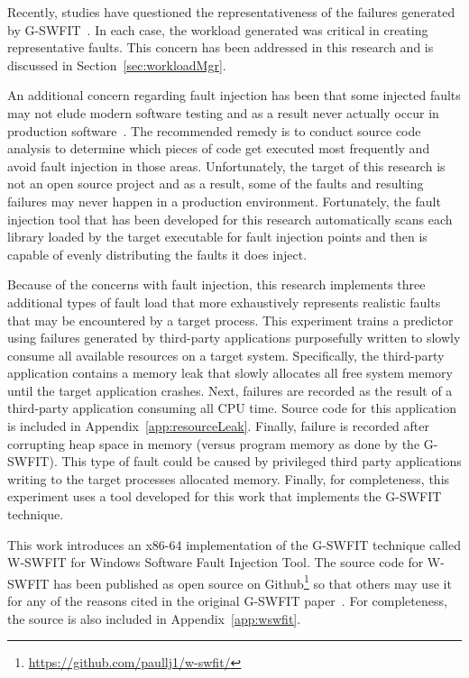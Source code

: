 Recently, studies have questioned the representativeness of the failures
generated by \ac{G-SWFIT}~\cite{kikuchi2014,cotroneo2012}.  In each case, the
workload generated was critical in creating representative faults.  This
concern has been addressed in this research and is discussed in
Section~\ref{sec:workloadMgr}.

An additional concern regarding fault injection has been that some injected
faults may not elude modern software testing and as a result never actually
occur in production software~\cite{natella2010}.  The recommended remedy is to
conduct source code analysis to determine which pieces of code get executed
most frequently and avoid fault injection in those areas.  Unfortunately, the
target of this research is not an open source project and as a result, some of
the faults and resulting failures may never happen in a production environment.
Fortunately, the fault injection tool that has been developed for this research
automatically scans each library loaded by the target executable for fault
injection points and then is capable of evenly distributing the faults it does
inject.

Because of the concerns with fault injection, this research implements three
additional types of fault load that more exhaustively represents realistic
faults that may be encountered by a target process.  This experiment trains a
predictor using failures generated by third-party applications purposefully
written to slowly consume all available resources on a target system.
Specifically, the third-party application contains a memory leak that slowly
allocates all free system memory until the target application crashes.  Next,
failures are recorded as the result of a third-party application consuming all
\ac{CPU} time.  Source code for this application is included in
Appendix~\ref{app:resourceLeak}.  Finally, failure is recorded after corrupting
heap space in memory (versus program memory as done by the \ac{G-SWFIT}).  This
type of fault could be caused by privileged third party applications writing to
the target processes allocated memory.  Finally, for completeness, this
experiment uses a tool developed for this work that implements the \ac{G-SWFIT}
technique.

This work introduces an x86-64 implementation of the \ac{G-SWFIT} technique
called \ac{W-SWFIT} for Windows Software Fault Injection Tool.  The source code
for \ac{W-SWFIT} has been published as open source on
Github\footnote{\url{https://github.com/paullj1/w-swfit/}} so that others may
use it for any of the reasons cited in the original \ac{G-SWFIT}
paper~\cite{gswfit}.  For completeness, the source is also included in
Appendix~\ref{app:wswfit}.  

